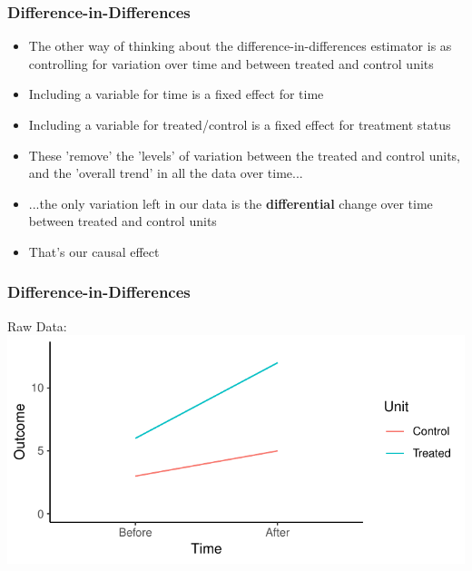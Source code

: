 \documentclass[xcolor=x11names,compress]{beamer}\usepackage[]{graphicx}\usepackage[]{color}
\makeatletter
\def\maxwidth{ %
  \ifdim\Gin@nat@width>\linewidth
    \linewidth
  \else
    \Gin@nat@width
  \fi
}
\newenvironment{knitrout}{}{} %
\renewcommand{\(}{\begin{columns}}
\renewcommand{\)}{\end{columns}}
\newcommand{\<}[1]{\begin{column}{#1}}
\renewcommand{\>}{\end{column}}
\makeatother
\begin{document}
\begin{frame}
\frametitle{Difference-in-Differences}
\begin{itemize}
\item The other way of thinking about the difference-in-differences estimator is as controlling for variation over time and between treated and control units
\pause
\item Including a variable for time is a fixed effect for time
\pause
\item Including a variable for treated/control is a fixed effect for treatment status
\pause
\item These 'remove' the 'levels' of variation between the treated and control units, and the 'overall trend' in all the data over time...
\pause
\item ...the only variation left in our data is the \textbf{differential} change over time between treated and control units
\pause
\item That's our causal effect
\end{itemize}
\end{frame}

\begin{frame}
\frametitle{Difference-in-Differences}
Raw Data:
\begin{knitrout}
\color{fgcolor}
\includegraphics[width=\maxwidth]{figure/DinD_chart2-1} 

\end{knitrout}
\end{frame}
\end{document}
